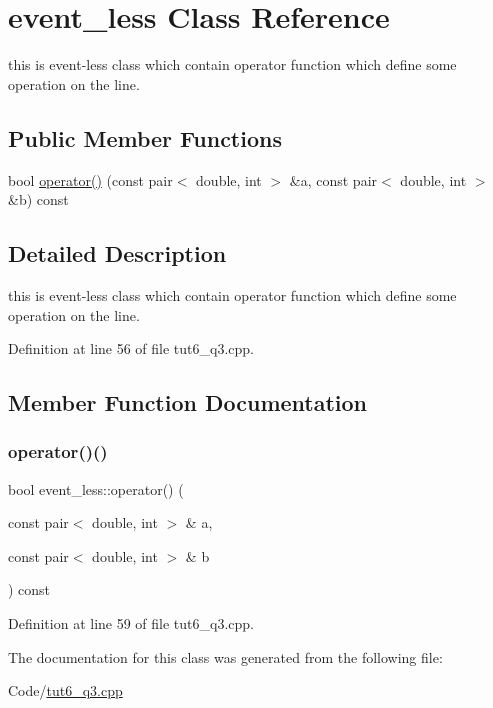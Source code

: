 \hypertarget{classevent__less}{}\section{event\+\_\+less Class Reference}
\label{classevent__less}


this is event-\/less class which contain operator function which define some operation on the line.  


\subsection*{Public Member Functions}
\begin{DoxyCompactItemize}
\item 
bool \hyperlink{classevent__less_aee69afb3953f36c9c2309250ef051b2e}{operator()} (const pair$<$ double, int $>$ \&a, const pair$<$ double, int $>$ \&b) const
\end{DoxyCompactItemize}


\subsection{Detailed Description}
this is event-\/less class which contain operator function which define some operation on the line. 

Definition at line 56 of file tut6\+\_\+q3.\+cpp.



\subsection{Member Function Documentation}
\mbox{\label{classevent__less_aee69afb3953f36c9c2309250ef051b2e}} 
\subsubsection{\texorpdfstring{operator()()}{operator()()}}
{\footnotesize\ttfamily bool event\+\_\+less\+::operator() (\begin{DoxyParamCaption}\item[{const pair$<$ double, int $>$ \&}]{a,  }\item[{const pair$<$ double, int $>$ \&}]{b }\end{DoxyParamCaption}) const\hspace{0.3cm}{\ttfamily [inline]}}



Definition at line 59 of file tut6\+\_\+q3.\+cpp.



The documentation for this class was generated from the following file\+:\begin{DoxyCompactItemize}
\item 
Code/\hyperlink{tut6__q3_8cpp}{tut6\+\_\+q3.\+cpp}\end{DoxyCompactItemize}
